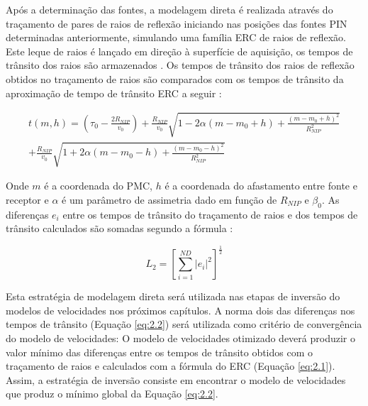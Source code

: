 Após a determinação das fontes, a modelagem direta é realizada através do traçamento de pares de raios de reflexão
iniciando nas posições das fontes PIN determinadas anteriormente, simulando uma família ERC de raios de reflexão.
Este leque de raios é lançado em direção à superfície de aquisição,
os tempos de trânsito dos raios são armazenados \cite{stereo}.
Os tempos de trânsito dos raios de reflexão obtidos no traçamento de raios são comparados com os tempos
de trânsito da aproximação de tempo de trânsito ERC a seguir \cite{cre}:

\begin{multline}
\label{eq:2.1}
t(m,h)= \left( \tau_0-\frac{2R_{NIP}}{v_0} \right) 
+\frac{R_{NIP}}{v_0}\sqrt{1-2\alpha(m-m_0+h)+\frac{(m-m_0+h)^2}{R_{NIP}^2}} \\
+\frac{R_{NIP}}{v_0}\sqrt{1+2\alpha(m-m_0-h)+\frac{(m-m_0-h)^2}{R_{NIP}^2}}
\end{multline}

Onde $m$ é a coordenada do PMC, $h$ é a coordenada do afastamento entre fonte e receptor e
$\alpha$ é um parâmetro de assimetria dado em função de $R_{NIP}$ e $\beta_0$.
As diferenças $e_i$ entre os tempos de trânsito do traçamento de raios e dos tempos de trânsito
calculados são somadas segundo a fórmula \cite{stoffa}:

\begin{equation}
\label{eq:2.2}
L_2 = \left[ \sum_{i=1}^{ND} |e_i|^2 \right]^\frac{1}{2}
\end{equation}


Esta estratégia de modelagem direta será utilizada nas etapas de inversão do modelos de velocidades nos
próximos capítulos. A norma dois das diferenças nos tempos de trânsito (Equação \ref{eq:2.2})
será utilizada como critério de
convergência do modelo de velocidades: O modelo de velocidades otimizado deverá produzir
o valor mínimo das diferenças entre os tempos de trânsito obtidos com o traçamento de raios
e calculados com a fórmula do ERC (Equação \ref{eq:2.1}). Assim, a estratégia de inversão consiste em
encontrar o modelo de velocidades que produz o mínimo global da Equação \ref{eq:2.2}.

